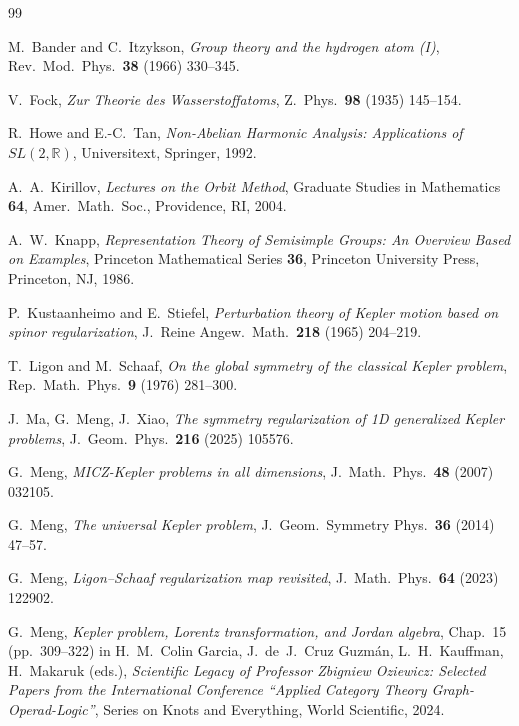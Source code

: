 \documentclass[11pt]{article}
\theoremstyle{plain}
\theoremstyle{definition}
\theoremstyle{remark}
\newcommand{\R}{\mathbb{R}}
\begin{document}
\begin{thebibliography}{99}

M.~Bander and C.~Itzykson,
\emph{Group theory and the hydrogen atom (I)},
Rev.\ Mod.\ Phys.\ \textbf{38} (1966) 330--345.

V.~Fock,
\emph{Zur Theorie des Wasserstoffatoms},
Z.\ Phys.\ \textbf{98} (1935) 145--154.

R.~Howe and E.-C.~Tan,
\emph{Non-Abelian Harmonic Analysis: Applications of $SL(2,\R)$},
Universitext, Springer, 1992.

A.~A.~Kirillov,
\emph{Lectures on the Orbit Method},
Graduate Studies in Mathematics \textbf{64}, Amer.\ Math.\ Soc., Providence, RI, 2004.

A.~W.~Knapp,
\emph{Representation Theory of Semisimple Groups: An Overview Based on Examples},
Princeton Mathematical Series \textbf{36}, Princeton University Press, Princeton, NJ, 1986.

P.~Kustaanheimo and E.~Stiefel,
\emph{Perturbation theory of Kepler motion based on spinor regularization},
J.~Reine Angew.\ Math.\ \textbf{218} (1965) 204--219.

T.~Ligon and M.~Schaaf,
\emph{On the global symmetry of the classical Kepler problem},
Rep.\ Math.\ Phys.\ \textbf{9} (1976) 281--300.

J.~Ma, G.~Meng, J.~Xiao,
\emph{The symmetry regularization of 1D generalized Kepler problems},
J.~Geom.\ Phys.\ \textbf{216} (2025) 105576.

G.~Meng,
\emph{MICZ-Kepler problems in all dimensions},
J.~Math.\ Phys.\ \textbf{48} (2007) 032105.

G.~Meng,
\emph{The universal Kepler problem},
J.~Geom.\ Symmetry Phys.\ \textbf{36} (2014) 47--57.

G.~Meng,
\emph{Ligon--Schaaf regularization map revisited},
J.~Math.\ Phys.\ \textbf{64} (2023) 122902.

G.~Meng,
\emph{Kepler problem, Lorentz transformation, and Jordan algebra},
Chap.~15 (pp.~309--322) in
H.~M.~Colin Garcia, J.~de~J.~Cruz Guzm\'an, L.~H.~Kauffman, H.~Makaruk (eds.),
\emph{Scientific Legacy of Professor Zbigniew Oziewicz: Selected Papers from the
International Conference ``Applied Category Theory Graph-Operad-Logic''},
Series on Knots and Everything, World Scientific, 2024.


\end{thebibliography}
\end{document}
